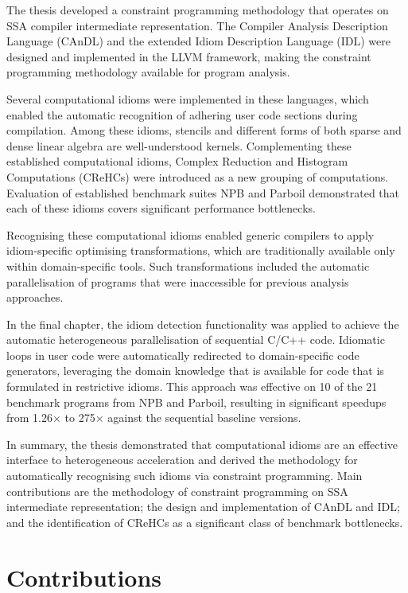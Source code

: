 
    The thesis developed a constraint programming methodology that operates on
    SSA compiler intermediate representation.
    The Compiler Analysis Description Language (CAnDL) and the extended Idiom
    Description Language (IDL) were designed and implemented in the LLVM
    framework, making the constraint programming methodology available for
    program analysis.

    Several computational idioms were implemented in these languages, which
    enabled the automatic recognition of adhering user code sections during
    compilation.
    Among these idioms, stencils and different forms of both sparse and
    dense linear algebra are well-understood kernels.
    Complementing these established computational idioms, Complex Reduction and
    Histogram Computations (CReHCs) were introduced as a new grouping of
    computations.
    Evaluation of established benchmark suites NPB and Parboil demonstrated that
    each of these idioms covers significant performance bottlenecks.

    Recognising these computational idioms enabled generic compilers to apply
    idiom-specific optimising transformations, which are traditionally available
    only within domain-specific tools.
    Such transformations included the automatic parallelisation of programs that
    were inaccessible for previous analysis approaches.

    In the final chapter, the idiom detection functionality was applied to
    achieve the automatic heterogeneous parallelisation of sequential C/C++
    code.
    Idiomatic loops in user code were automatically redirected to
    domain-specific code generators, leveraging the domain knowledge that is
    available for code that is formulated in restrictive idioms.
    This approach was effective on 10 of the 21 benchmark programs from NPB and
    Parboil, resulting in significant speedups from 1.26$\times$  to 275$\times$
    against the sequential baseline versions.

    In summary, the thesis demonstrated that computational idioms are an
    effective interface to heterogeneous acceleration and derived the
    methodology for automatically recognising such idioms via constraint
    programming.
    Main contributions are the methodology of constraint programming on SSA
    intermediate representation; the design and implementation of CAnDL and IDL;
    and the identification of CReHCs as a significant class of benchmark
    bottlenecks.

\section{Contributions}

